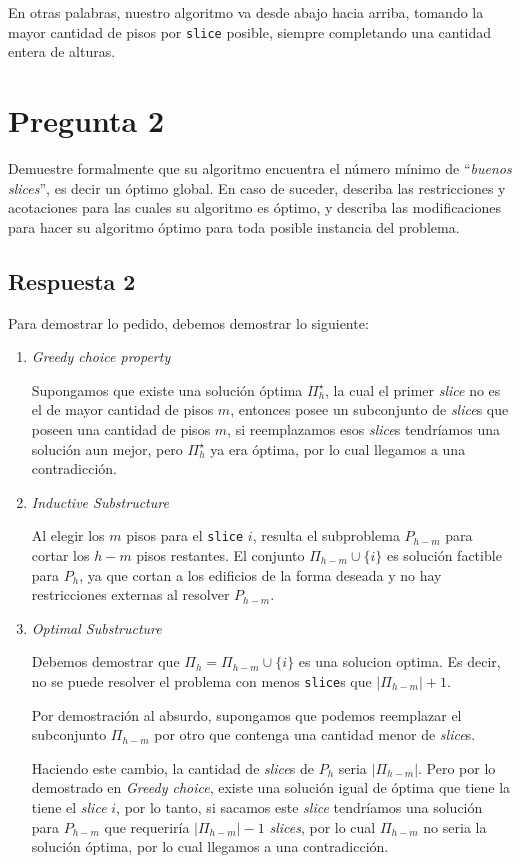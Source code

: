 \documentclass[spanish, fleqn]{article}
\newcommand\tab[1][0.5cm]{\hspace*{#1}}
\begin{document}
En otras palabras, nuestro algoritmo va desde abajo hacia arriba, tomando la mayor cantidad de pisos por \texttt{slice} posible, siempre completando una cantidad entera de alturas.

\section{Pregunta 2}

Demuestre formalmente que su algoritmo encuentra el número mínimo de ``\textit{buenos slices}'', es decir un óptimo global. En caso de suceder, describa las restricciones y acotaciones para las cuales su algoritmo es óptimo, y describa las modificaciones para hacer su algoritmo óptimo para toda posible instancia del problema.

\subsection{Respuesta 2}

Para demostrar lo pedido, debemos demostrar lo siguiente:

\begin{enumerate}
    \item \textit{Greedy choice property}
    
    \tab Supongamos que existe una solución óptima $\Pi_{h}^{\star}$, la cual el primer \textit{slice} no es el de mayor cantidad de pisos $m$, entonces posee un subconjunto de \textit{slice}s que poseen una cantidad de pisos $m$, si reemplazamos esos \textit{slice}s tendríamos una solución aun mejor, pero $\Pi_{h}^{\star}$ ya era óptima, por lo cual llegamos a una contradicción.
    
    \item \textit{Inductive Substructure}
    
    \tab Al elegir los $m$ pisos para el \texttt{slice} $i$, resulta el subproblema $P_{h-m}$ para cortar los $h-m$ pisos restantes.
    El conjunto $\Pi_{h-m} \cup \{i\}$ es solución factible para $P_h$, ya que cortan a los edificios de la forma deseada y no hay restricciones externas al resolver $P_{h-m}$.
    
    \item \textit{Optimal Substructure}
    
    \tab Debemos demostrar que $\Pi_{h} = \Pi_{h-m} \cup \{i\}$ es una solucion optima. Es decir, no se puede resolver el problema con menos \texttt{slice}s que $|\Pi_{h-m}| + 1$.
    
    \tab Por demostración al absurdo, supongamos que podemos reemplazar el subconjunto $\Pi_{h-m}$ por otro que contenga una cantidad menor de \textit{slice}s.
    
    Haciendo este cambio, la cantidad de \textit{slice}s de $P_h$ seria $|\Pi_{h-m}|$. Pero por lo demostrado en \textit{Greedy choice}, existe una solución igual de óptima que tiene la tiene el \textit{slice} $i$, por lo tanto, si sacamos este \textit{slice} tendríamos una solución para $P_{h-m}$ que requeriría $|\Pi_{h-m}| - 1$ \textit{slices}, por lo cual $\Pi_{h-m}$ no seria la solución óptima, por lo cual llegamos a una contradicción.

\end{enumerate}
\end{document}
